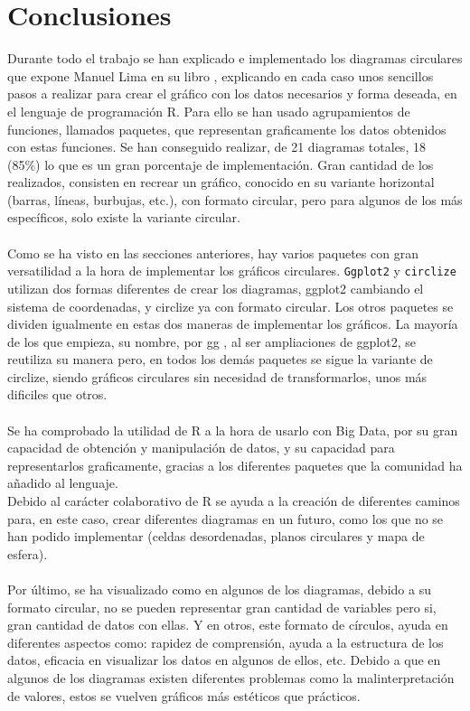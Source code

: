 \documentclass{article}\usepackage[]{graphicx}\usepackage[]{color}
\begin{document}
\section{Conclusiones}
Durante todo el trabajo se han explicado e implementado los diagramas circulares que expone Manuel Lima en su libro %
, explicando en cada caso unos sencillos pasos a realizar para crear el gr\'afico con los datos necesarios y forma deseada, en el lenguaje de programaci\'on R. Para ello se han usado agrupamientos de funciones, llamados paquetes, que representan graficamente los datos obtenidos con estas funciones.
Se han conseguido realizar, de 21 diagramas totales, 18 (85\%) lo que es un gran porcentaje de implementaci\'on. Gran cantidad de los realizados, consisten en recrear un gr\'afico, conocido en su variante horizontal (barras, l\'ineas, burbujas, etc.), con formato circular, pero para algunos de los m\'as espec\'ificos, solo existe la variante circular. ~\\~\\
Como se ha visto en las secciones anteriores, hay varios paquetes con gran versatilidad a la hora de implementar los gr\'aficos circulares. \texttt{Ggplot2} y \texttt{circlize} utilizan dos formas diferentes de crear los diagramas, ggplot2 cambiando el sistema de coordenadas, y circlize ya con formato circular. Los otros paquetes se dividen igualmente en estas dos maneras de implementar los gr\'aficos. La mayor\'ia de los que empieza, su nombre, por gg , al ser ampliaciones de ggplot2, se reutiliza su manera pero, en todos los dem\'as paquetes se sigue la variante de circlize, siendo gr\'aficos circulares sin necesidad de transformarlos, unos m\'as dificiles que otros.~\\~\\
Se ha comprobado la utilidad de R a la hora de usarlo con Big Data, por su gran capacidad de obtenci\'on y manipulaci\'on de datos, y su capacidad para representarlos graficamente, gracias a los diferentes paquetes que la comunidad ha a\~nadido al lenguaje.~\\ Debido al car\'acter colaborativo de R se ayuda a la creaci\'on de diferentes caminos para, en este caso, crear diferentes diagramas en un futuro, como los que no se han podido implementar (celdas desordenadas, planos circulares y mapa de esfera).~\\~\\
Por \'ultimo, se ha visualizado como en algunos de los diagramas, debido a su formato circular, no se pueden representar gran cantidad de variables pero si, gran cantidad de datos con ellas. Y en otros, este formato de c\'irculos, ayuda en diferentes aspectos como: rapidez de comprensi\'on, ayuda a la estructura de los datos, eficacia en visualizar los datos en algunos de ellos, etc. Debido a que en algunos de los diagramas existen diferentes problemas como la malinterpretaci\'on de valores, estos se vuelven gr\'aficos m\'as est\'eticos que pr\'acticos.
\clearpage
{}
%
%
\end{document}
